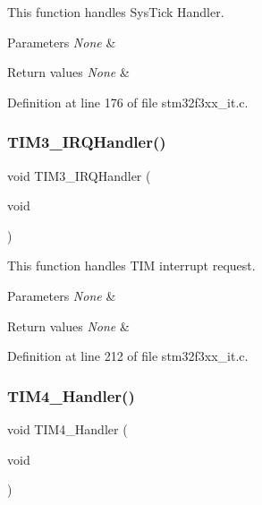 This function handles Sys\+Tick Handler. 


\begin{DoxyParams}{Parameters}
{\em None} & \\
\hline
\end{DoxyParams}

\begin{DoxyRetVals}{Return values}
{\em None} & \\
\hline
\end{DoxyRetVals}


Definition at line 176 of file stm32f3xx\+\_\+it.\+c.

\mbox{\label{group___c_a_n___networking_gac8e51d2183b5230cbd5481f8867adce9}} 
\subsubsection{T\+I\+M3\+\_\+\+I\+R\+Q\+Handler()}
{\footnotesize\ttfamily void T\+I\+M3\+\_\+\+I\+R\+Q\+Handler (\begin{DoxyParamCaption}\item[{void}]{ }\end{DoxyParamCaption})}



This function handles T\+IM interrupt request. 


\begin{DoxyParams}{Parameters}
{\em None} & \\
\hline
\end{DoxyParams}

\begin{DoxyRetVals}{Return values}
{\em None} & \\
\hline
\end{DoxyRetVals}


Definition at line 212 of file stm32f3xx\+\_\+it.\+c.

\mbox{\label{group___c_a_n___networking_ga989904a5235fb9d65b630c90d44189a4}} 
\subsubsection{T\+I\+M4\+\_\+\+Handler()}
{\footnotesize\ttfamily void T\+I\+M4\+\_\+\+Handler (\begin{DoxyParamCaption}\item[{void}]{ }\end{DoxyParamCaption})}



